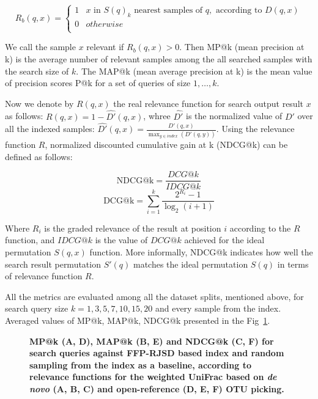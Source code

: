 \documentclass[10pt,letterpaper]{article}
\begin{document}
\[ R_b(q, x)  =
  \begin{cases}
    1  & x \text{ in } S(q)_k \text{ nearest samples of } q, \text{ according to } D(q, x)\\
    0  &  otherwise \\
  \end{cases}
\] 

We call the sample $x$ relevant if $R_b(q, x) > 0$. Then MP@k (mean precision at k) is the average number of relevant samples among the all searched samples with the search size of $k$. 
The MAP@k (mean average precision at k) is the mean value of precision scores P@k for a set of queries of size $1, \dots, k$.

Now we denote by $R(q, x)$ the real relevance function for search output result $x$ as follows:
$R(q, x) = 1 - \hat{D'}(q, x)$, whree $\hat{D'}$ 
is the normalized value of $D'$ over all the indexed samples: $\hat{D'}(q, x) = \frac{D'(q, x)} {\displaystyle\max_{y \in index} (D'(q, y)) }$.
Using the relevance function $R$, normalized discounted cumulative gain at k (NDCG@k) can be defined as follows:

$$\mathrm{NDCG@k} = \frac{DCG@k}{IDCG@k}$$
$${\mathrm{DCG@k} = \sum_{i=1}^{k} \frac{2^{R_i} - 1} {\log_{2}(i + 1)} }$$

Where $\displaystyle R_{i}$ is the graded relevance of the result at position $\displaystyle i$ according to the $R$ function,
and $IDCG@k$ is the value of $DCG@k$ achieved for the ideal permutation $S(q, x)$ function.
More informally, NDCG@k indicates how well the search result permutation $S'(q)$ matches the ideal permutation $S(q)$ in terms of
relevance function $R$.

All the metrics are evaluated among all the dataset splits, mentioned above, for search query size $k = {1, 3, 5, 7, 10, 15, 20}$ 
and every sample from the index. Averaged values of MP@k, MAP@k, NDCG@k presented in the Fig~\ref{fig5}.


\begin{figure}[!h]
\caption{{\bf MP@k (A, D), MAP@k (B, E) and NDCG@k (C, F) for search queries against FFP-RJSD based index and random sampling from the index as a baseline, 
according to relevance functions for the weighted UniFrac based on \textit{de novo} (A, B, C) and open-reference (D, E, F) OTU picking.}}
\label{fig5}
\end{figure}
\end{document}
